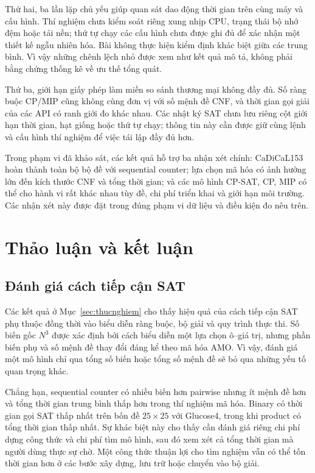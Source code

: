 \documentclass[a4paper,fleqn]{cas-sc}
\begin{document}
Thứ hai, ba lần lặp chủ yếu giúp quan sát dao động thời gian trên cùng
máy và cấu hình. Thí nghiệm chưa kiểm soát riêng xung nhịp CPU, trạng
thái bộ nhớ đệm hoặc tải nền; thứ tự chạy các cấu hình chưa được ghi
đủ để xác nhận một thiết kế ngẫu nhiên hóa. Bài không thực hiện kiểm
định khác biệt giữa các trung bình. Vì vậy những chênh lệch nhỏ được xem như kết quả mô tả,
không phải bằng chứng thống kê về ưu thế tổng quát.

Thứ ba, giới hạn giấy phép làm miền so sánh thương mại không đầy đủ.
Số ràng buộc CP/MIP cũng không cùng đơn vị với số mệnh đề CNF, và
thời gian gọi giải của các API có ranh giới đo khác nhau.
Các nhật ký SAT chưa lưu riêng cột giới hạn thời gian, hạt giống hoặc
thứ tự chạy; thông tin này cần được giữ cùng lệnh và cấu hình thí
nghiệm để việc tái lập đầy đủ hơn.

Trong phạm vi đã khảo sát, các kết quả hỗ trợ ba nhận xét chính:
CaDiCaL153 hoàn thành toàn bộ bộ đề với sequential counter;
lựa chọn mã hóa có ảnh hưởng lớn đến kích thước CNF và tổng thời gian;
và các mô hình CP-SAT, CP, MIP có thể cho hành vi rất khác nhau tùy
đề, chi phí triển khai và giới hạn môi trường. Các nhận xét này được
đặt trong đúng phạm vi dữ liệu và điều kiện đo nêu trên.

\section{Thảo luận và kết luận}
\label{sec:ketluan}

\subsection{Đánh giá cách tiếp cận SAT}

Các kết quả ở Mục~\ref{sec:thucnghiem} cho thấy hiệu quả của cách tiếp
cận SAT phụ thuộc đồng thời vào biểu diễn ràng buộc, bộ giải và quy
trình thực thi. Số biến gốc $N^3$ được xác định bởi cách biểu diễn một
lựa chọn ô--giá trị, nhưng phần biến phụ và số mệnh đề thay đổi đáng kể
theo mã hóa AMO. Vì vậy, đánh giá một mô hình chỉ qua tổng số biến hoặc
tổng số mệnh đề sẽ bỏ qua những yếu tố quan trọng khác.

Chẳng hạn, sequential counter có nhiều biến hơn pairwise nhưng ít
mệnh đề hơn và tổng thời gian trung bình thấp hơn trong thí nghiệm
mã hóa. Binary có thời gian gọi SAT thấp nhất trên bốn đề
$25\times25$ với Glucose4, trong khi product có tổng thời gian thấp
nhất. Sự khác biệt này cho thấy cần đánh giá riêng chi phí dựng công
thức và chi phí tìm mô hình, sau đó xem xét cả tổng thời gian mà người
dùng thực sự chờ. Một công thức thuận lợi cho tìm nghiệm vẫn có thể
tốn thời gian hơn ở các bước xây dựng, lưu trữ hoặc chuyển vào bộ giải.
\end{document}
